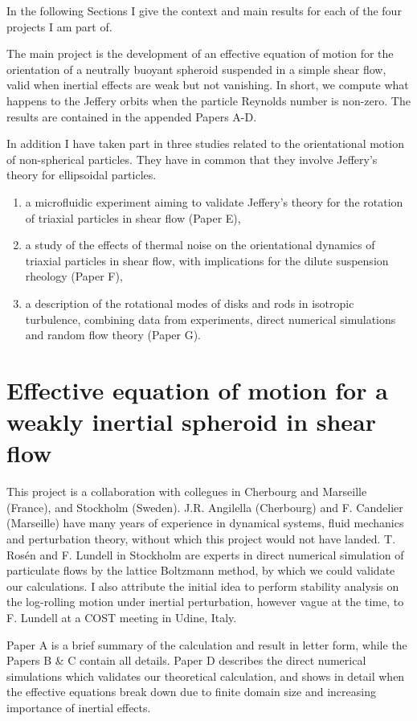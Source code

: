 \documentclass[thesis.tex]{subfiles}
\begin{document}
In the following Sections I give the context and main results for each of the four projects I am part of. 

The main project is the development of an effective equation of motion for the orientation of a neutrally buoyant spheroid suspended in a simple shear flow, valid when inertial effects are weak but not vanishing. In short, we compute what happens to the Jeffery orbits when the particle Reynolds number is non-zero. The results are contained in the appended Papers A-D.

In addition I have taken part in three studies related to the orientational motion of non-spherical particles. They have in common that they involve Jeffery's theory for ellipsoidal particles.
\begin{enumerate}
    \item a microfluidic experiment aiming to validate Jeffery's theory for the rotation of triaxial particles in shear flow (Paper E),
    \item a study of the effects of thermal noise on the orientational dynamics of triaxial particles in shear flow, with implications for the dilute suspension rheology (Paper F),
    \item a description of the rotational modes of disks and rods in isotropic turbulence, combining data from experiments, direct numerical simulations and random flow theory (Paper G).
\end{enumerate}


\chapter{Effective equation of motion for a weakly inertial spheroid in shear flow}

This project is a collaboration with collegues in Cherbourg and Marseille (France), and Stockholm (Sweden). J.R. Angilella (Cherbourg) and F. Candelier (Marseille) have many years of experience in dynamical systems, fluid mechanics and perturbation theory, without which this project would not have landed. T. Ros\'en and F. Lundell in Stockholm are experts in direct numerical simulation of particulate flows by the lattice Boltzmann method, by which we could validate our calculations. I also attribute the initial idea to perform stability analysis on the log-rolling motion under inertial perturbation, however vague at the time, to F. Lundell at a COST meeting in Udine, Italy. 

Paper A is a brief summary of the calculation and result in letter form, while the Papers B \& C contain all details. Paper D describes the direct numerical simulations which validates our theoretical calculation, and shows in detail when the effective equations break down due to finite domain size and increasing importance of inertial effects.
\end{document}
